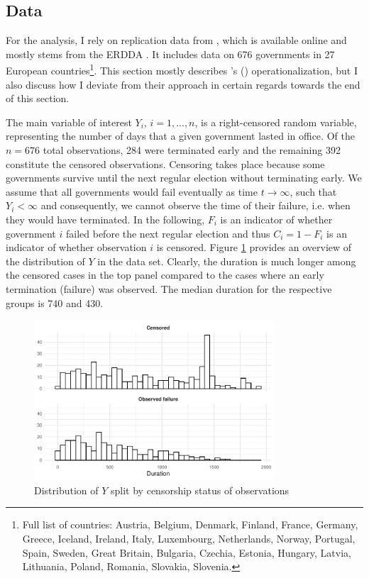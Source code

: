 \documentclass[11pt]{article}
\newcommand\possecite[1]{\citeauthor{#1}'s (\citeyear{#1})}
\newcommand\minp[1]{\begin{minipage}{0.8\textwidth} #1 \end{minipage}}
\begin{document}
\subsection{Data}
For the analysis, I rely on replication data from \textcite{KK20}, which is available online and mostly stems from the ERDDA \parencite{ERD2014}. It includes data on 676 governments in 27 European countries\footnote{Full list of countries: Austria, Belgium, Denmark, Finland, France, Germany, Greece, Iceland, Ireland, Italy, Luxembourg, Netherlands, Norway, Portugal, Spain, Sweden, Great Britain, Bulgaria, Czechia, Estonia, Hungary, Latvia, Lithuania, Poland, Romania, Slovakia, Slovenia.}. This section mostly describes \possecite{KK20} operationalization, but I also discuss how I deviate from their approach in certain regards towards the end of this section.

The main variable of interest $Y_i$, $i = 1, ..., n$, is a right-censored random variable, representing the number of days that a given government lasted in office. Of the $n = 676$ total observations, 284 were terminated early and the remaining 392 constitute the censored observations. Censoring takes place because some governments survive until the next regular election without terminating early. We assume that all governments would fail eventually as time $t \to \infty$, such that $Y_i < \infty$ and consequently, we cannot observe the time of their failure, i.e. when they would have terminated. In the following, $F_i$ is an indicator of whether government $i$ failed before the next regular election and thus $C_i = 1-F_i$ is an indicator of whether observation $i$ is censored. Figure \ref{fig:DVsummary} provides an overview of the distribution of $Y$ in the data set. Clearly, the duration is much longer among the censored cases in the top panel compared to the cases where an early termination (failure) was observed. The median duration for the respective groups is 740 and 430.

\begin{figure}[!ht]
    \centering
    \minp{\caption{Distribution of $Y$ split by censorship status of observations} \label{fig:DVsummary}}
    \includegraphics[width = 0.8\textwidth]{figures/fig5_DVsummary.pdf}
\end{figure}
\end{document}
